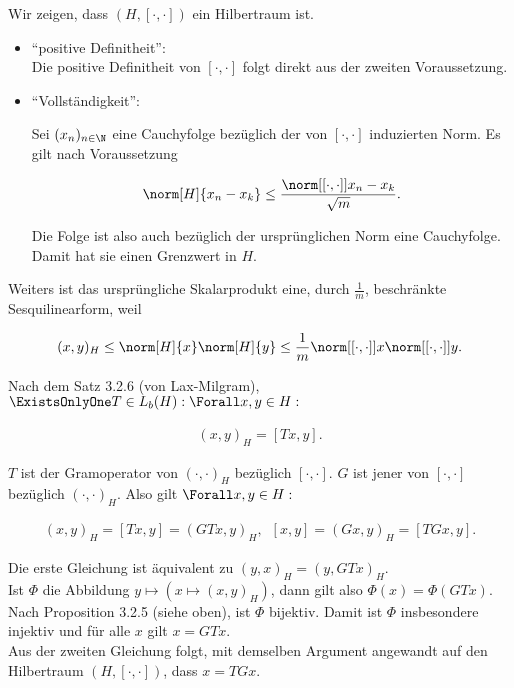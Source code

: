 \begin{solution}

Wir zeigen, dass $(H, [\cdot, \cdot])$ ein Hilbertraum ist.

\begin{itemize}

  \item
  \enquote{positive Definitheit}: \\

  Die positive Definitheit von $[\cdot, \cdot]$ folgt direkt aus der zweiten Voraussetzung. \\

  \item
  \enquote{Vollständigkeit}:

  Sei $(x_n)_{n \in \N}$ eine Cauchyfolge bezüglich der von $[\cdot, \cdot]$ induzierten Norm.
  Es gilt nach Voraussetzung

  \begin{align*}
      \norm[H]{x_n - x_k}
      \leq
      \frac
      {
        \norm[{[\cdot, \cdot]}]{x_n - x_k}
      }{
        \sqrt{m}
      }.
  \end{align*}

  Die Folge ist also auch bezüglich der ursprünglichen Norm eine Cauchyfolge.
  Damit hat sie einen Grenzwert in $H$.

\end{itemize}

Weiters ist das ursprüngliche Skalarprodukt eine, durch $\frac{1}{m}$, beschränkte Sesquilinearform, weil

\begin{align*}
  (x, y)_H
  \leq
  \norm[H]{x} \norm[H]{y}
  \leq
  \frac{1}{m} \norm[{[\cdot, \cdot]}]{x} \norm[{[\cdot, \cdot]}]{y}.
\end{align*}


Nach dem Satz 3.2.6 (von Lax-Milgram), $\ExistsOnlyOne T \in L_b(H): \Forall x, y \in H:$

\begin{align*}
    (x, y)_H = [T x, y].
\end{align*}

$T$ ist der Gramoperator von $(\cdot, \cdot)_H$ bezüglich $[\cdot, \cdot]$.
$G$ ist jener von $[\cdot, \cdot]$ bezüglich $(\cdot, \cdot)_H$.
Also gilt $\Forall x, y \in H:$

\begin{align*}
    (x, y)_H = [T x, y] = (G T x, y)_H,
    \enspace
    [x, y] = (G x, y)_H = [T G x, y].
\end{align*}

Die erste Gleichung ist äquivalent zu $(y, x)_H = (y, GTx)_H$. \\

Ist $\Phi$ die Abbildung $y \mapsto (x \mapsto (x, y)_H)$, dann gilt also $\Phi(x) = \Phi(GTx)$.
Nach Proposition 3.2.5 (siehe oben), ist $\Phi$ bijektiv.
Damit ist $\Phi$ insbesondere injektiv und für alle $x$ gilt $x = GTx$. \\

Aus der zweiten Gleichung folgt, mit demselben Argument angewandt auf den Hilbertraum $(H, [\cdot, \cdot])$, dass $x = T G x.$

\end{solution}
